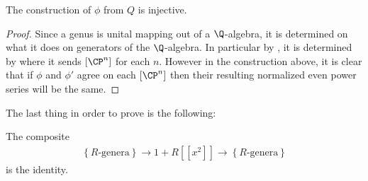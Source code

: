 \documentclass[11pt]{book}
\begin{document}
\begin{proposition} The construction of $\phi$ from $Q$ is injective.
\end{proposition}
\begin{proof} Since a genus is unital mapping out of a $\Q$-algebra, it is determined on what it does on generators of the $\Q$-algebra. In particular by , it is determined by where it sends $[\CP^n]$ for each $n$. However in the construction above, it is clear that if $\phi$ and $\phi'$ agree on each $[\CP^n]$ then their resulting normalized even power series will be the same.
\end{proof}

The last thing in order to prove  is the following:

\begin{proposition} The composite
\begin{align*}
    \left\{ R\text{-genera} \right\} \to 1 + R[[x^2]] \to \left\{ R\text{-genera} \right\}
\end{align*}
is the identity.
\end{proposition}
\end{document}
